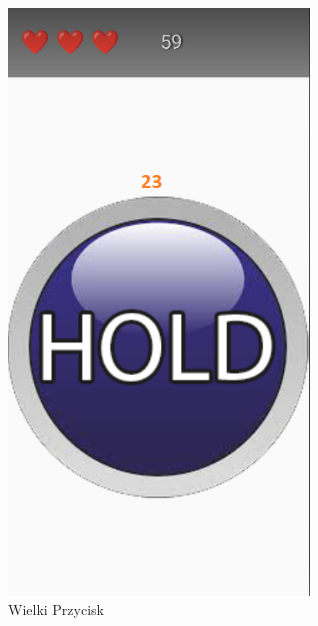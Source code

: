 	\begin{figure}[!htb]
	\begin{center}
		\includegraphics[width=8cm]{rys/opis12.png}
		\caption{Wielki Przycisk}
		\label{rys:rysunek001}
	\end{center}
\end{figure}

